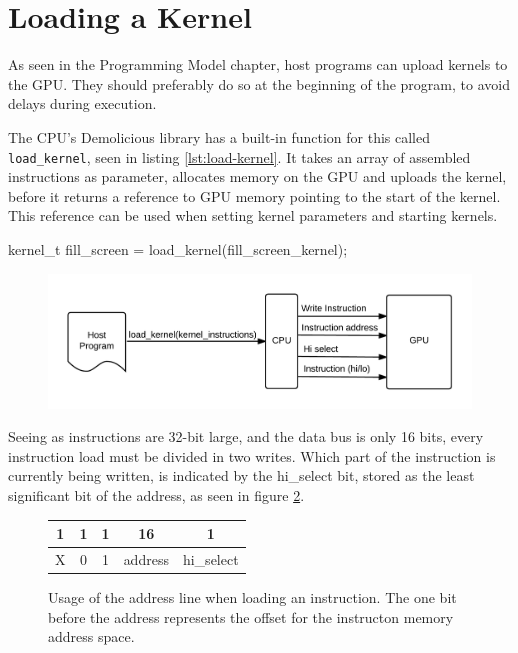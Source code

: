 \section{Loading a Kernel}
As seen in the Programming Model chapter, host programs can upload kernels to the GPU.
They should preferably do so at the beginning of the program, to avoid delays during execution.

The CPU's Demolicious library has a built-in function for this called \verb/load_kernel/, seen in listing \ref{lst:load-kernel}.
It takes an array of assembled instructions as parameter,
allocates memory on the GPU and uploads the kernel,
before it returns a reference to GPU memory pointing to the start of the kernel.
This reference can be used when setting kernel parameters and starting kernels.

\begin{c-code}[caption=A load\_kernel function call with the fillscreen kernel, label=lst:load-kernel]
kernel_t fill_screen = load_kernel(fill_screen_kernel);
\end{c-code}

\begin{figure}[H]
    \centering
    \includegraphics[width=\textwidth]{../cpu/diagrams/loading_a_kernel.png}
    \caption{}
    \label{fig:loading_a_kernel}
\end{figure}

Seeing as instructions are 32-bit large, and the data bus is only 16 bits,
every instruction load must be divided in two writes.
Which part of the instruction is currently being written,
is indicated by the hi\_select bit, stored as the least significant bit of the address, as seen in figure \ref{fig:load_instruction_format}.

\begin{figure}[H]
    \centering
    \begin{tabular}{|c|c|c|c|c|}
    \multicolumn{1}{c}{1} & \multicolumn{1}{c}{1} & \multicolumn{1}{c}{1} & \multicolumn{1}{c}{16}  & \multicolumn{1}{c}{1} \\ \hline
    X & 0 & 1 & address & hi\_select \\ \hline
    \end{tabular}
    \caption{Usage of the address line when loading an instruction. The one bit before the address represents the offset for the instructon memory address space.}
    \label{fig:load_instruction_format}
\end{figure}
